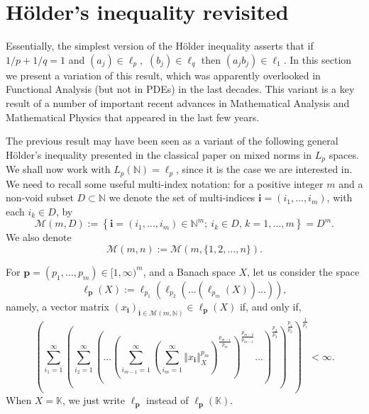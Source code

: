 \documentclass[10pt]{amsart}
\numberwithin{equation}{section}
\begin{document}
\section{H\"{o}lder's inequality revisited\label{sec3}}

Essentially, the simplest version of the H\"{o}lder inequality asserts that
if $1/p+1/q=1$ and $\left( a_{j}\right) \in \ell _{p},$ $\left( b_{j}\right)
\in \ell _{q}$ then $\left( a_{j}b_{j}\right) \in \ell _{1}.$ In this
section we present a variation of this result, which was apparently
overlooked in Functional Analysis (but not in PDEs) in the last decades.
This variant is a key result of a number of important recent advances in
Mathematical Analysis and Mathematical Physics that appeared in the last few
years.

The previous result may have been seen as a variant of the following general
H\"{o}lder's inequality presented in the classical paper \cite{bene} on
mixed norms in $L_{p}$ spaces. We shall now work with $L_p(\mathbb{N}) =
\ell_p$, since it is the case we are interested in. We need to recall some
useful multi-index notation: for a positive integer $m$ and a non-void
subset $D\subset \mathbb{N}$ we denote the set of multi-indices $\mathbf{i}=(i_{1},\dots ,i_{m})$, with each $i_{k}\in D$, by
\begin{equation*}
\mathcal{M}(m,D):=\left\{ \mathbf{i}=(i_{1},\dots ,i_{m})\in \mathbb{N}^{m};\ i_{k}\in D,\,k=1,\dots ,m\right\} =D^{m}.
\end{equation*}
We also denote
\begin{equation*}
\mathcal{M}(m,n):=\mathcal{M}(m,\{1, 2, \ldots, n\}).
\end{equation*}

For $\mathbf{p}=(p_{1},\dots ,p_{m})\in \lbrack 1, \infty )^{m}$, and a
Banach space $X$, let us consider the space
\begin{equation*}
\ell _{\mathbf{p}}(X):=\ell _{p_{1}}\left( \ell _{p_{2}}\left( \dots \left(
\ell _{p_{m}}(X)\right) \dots \right) \right) ,
\end{equation*}namely, a vector matrix $\left( x_{\mathbf{i}}\right) _{\mathbf{i}\in
\mathcal{M}(m,\mathbb{N})}\in \ell _{\mathbf{p}}(X)$ if, and only if,
\begin{equation*}
\left( \sum_{i_{1}=1}^{\infty }\left( \sum_{i_{2}=1}^{\infty }\left( \dots
\left( \sum_{i_{m-1}=1}^{\infty }\left( \sum_{i_{m}=1}^{\infty }\left\Vert
x_{\mathbf{i}}\right\Vert _{X}^{p_{m}}\right) ^{\frac{p_{m-1}}{p_{m}}}\right) ^{\frac{p_{m-2}}{p_{m-1}}}\dots \right) ^{\frac{p_{2}}{p_{3}}}\right) ^{\frac{p_{1}}{p_{2}}}\right) ^{\frac{1}{p_{1}}}< \infty .
\end{equation*}When $X=\mathbb{K}$, we just write $\ell _{\mathbf{p}}$ instead of $\ell _{\mathbf{p}}(\mathbb{K})$.
\end{document}
